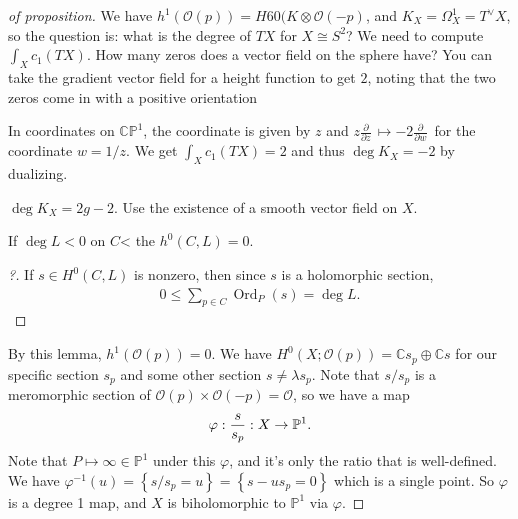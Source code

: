 \begin{proof}[of proposition]
We have \(h^1( {\mathcal{O}}(p) ) = H60( K \otimes{\mathcal{O}}(-p)\),
and \(K_X = \Omega_X^1 = T^\vee X\), so the question is: what is the
degree of \(TX\) for \(X\cong S^2\)? We need to compute
\(\int_X c_1(TX)\). How many zeros does a vector field on the sphere
have? You can take the gradient vector field for a height function to
get \(2\), noting that the two zeros come in with a positive orientation

\begin{figure}
\centering
{}
\end{figure}

In coordinates on \({\mathbb{CP}}^1\), the coordinate is given by \(z\)
and
\(z {\frac{\partial }{\partial z}\,} \mapsto -2 {\frac{\partial }{\partial w}\,}\)
for the coordinate \(w = 1/z\). We get \(\int_X c_1(TX) = 2\) and thus
\(\deg K_X = -2\) by dualizing.

\begin{fact}

\(\deg K_X = 2g-2\). Use the existence of a smooth vector field on
\(X\).

\end{fact}

\begin{lemma}[?]

If \(\deg L < 0\) on \(C\)\textless{} the \(h^0(C, L) = 0\).

\end{lemma}

\begin{proof}[?]

If \(s\in H^0(C, L)\) is nonzero, then since \(s\) is a holomorphic
section,
\begin{align*}
0 \leq \sum_{p\in C} {\operatorname{Ord}}_P (s) = \deg L
.\end{align*}

\end{proof}

By this lemma, \(h^1({\mathcal{O}}(p)) = 0\). We have
\(H^0(X; {\mathcal{O}}(p)) = {\mathbb{C}}s_p \oplus {\mathbb{C}}s\) for
our specific section \(s_p\) and some other section
\(s \neq \lambda s_p\). Note that \(s/s_p\) is a meromorphic section of
\({\mathcal{O}}(p) \times{\mathcal{O}}(-p) = {\mathcal{O}}\), so we have
a map
\begin{align*}
\varphi: {s \over s_p} : X\to {\mathbb{P}}^1
.\end{align*}
Note that \(P\mapsto \infty \in {\mathbb{P}}^1\) under this \(\varphi\),
and it's only the ratio that is well-defined. We have
\(\varphi ^{-1} (u) = \left\{{ s/s_p = u }\right\} = \left\{{ s - us_p =0 }\right\}\)
which is a single point. So \(\varphi\) is a degree 1 map, and \(X\) is
biholomorphic to \({\mathbb{P}}^1\) via \(\varphi\).

\end{proof}


